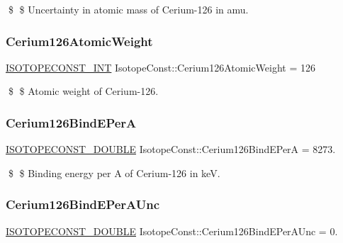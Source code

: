 \$ \$ Uncertainty in atomic mass of Cerium-\/126 in amu. \mbox{\label{group___isotope_const-_cerium-_ce126_ga768b29d406a1ebce80e4b4f51a12af5d}} 
\subsubsection{\texorpdfstring{Cerium126\+Atomic\+Weight}{Cerium126AtomicWeight}}
{\footnotesize\ttfamily \mbox{\hyperlink{group___isotope_const-_macros_ga5f18360b3e99483a35c32d789e62621c}{I\+S\+O\+T\+O\+P\+E\+C\+O\+N\+S\+T\+\_\+\+I\+NT}} Isotope\+Const\+::\+Cerium126\+Atomic\+Weight = 126}

\$ \$ Atomic weight of Cerium-\/126. \mbox{\label{group___isotope_const-_cerium-_ce126_ga972639953c24e0d057480703be8d19d2}} 
\subsubsection{\texorpdfstring{Cerium126\+Bind\+E\+PerA}{Cerium126BindEPerA}}
{\footnotesize\ttfamily \mbox{\hyperlink{group___isotope_const-_macros_ga8f45a7272ce02c0b4c65c44636ed719a}{I\+S\+O\+T\+O\+P\+E\+C\+O\+N\+S\+T\+\_\+\+D\+O\+U\+B\+LE}} Isotope\+Const\+::\+Cerium126\+Bind\+E\+PerA = 8273.}

\$ \$ Binding energy per A of Cerium-\/126 in keV. \mbox{\label{group___isotope_const-_cerium-_ce126_ga162c8f803e1bfb506247a264311086cb}} 
\subsubsection{\texorpdfstring{Cerium126\+Bind\+E\+Per\+A\+Unc}{Cerium126BindEPerAUnc}}
{\footnotesize\ttfamily \mbox{\hyperlink{group___isotope_const-_macros_ga8f45a7272ce02c0b4c65c44636ed719a}{I\+S\+O\+T\+O\+P\+E\+C\+O\+N\+S\+T\+\_\+\+D\+O\+U\+B\+LE}} Isotope\+Const\+::\+Cerium126\+Bind\+E\+Per\+A\+Unc = 0.}

